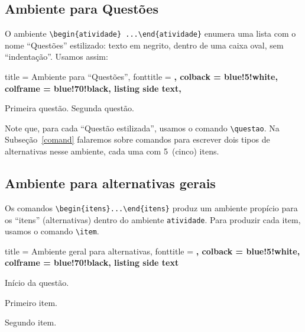 \subsection{Ambiente para Questões}

O ambiente \verb|\begin{atividade} ...\end{atividade}| enumera uma lista com o
nome ``Questões'' estilizado: texto em negrito, dentro de uma caixa oval, sem
``indentação''.
Usamos assim:

\begin{tcblisting}
{
  title     = Ambiente para ``Questões'',
  fonttitle = \bfseries,
  colback   = blue!5!white,
  colframe  = blue!70!black,
  listing side text,
}
\begin{atividade}
 \questao Primeira questão.
 \questao Segunda questão.
\end{atividade}
\end{tcblisting}

Note que, para cada ``Questão estilizada'', usamos o comando \verb|\questao|.
Na Subseção~\ref{comand} falaremos sobre comandos para escrever dois tipos de 
alternativas nesse ambiente, cada uma com 5~(cinco) itens.

\subsection{Ambiente para alternativas gerais}

Os comandos \verb|\begin{itens}...\end{itens}| produz um ambiente propício para
os ``itens'' (alternativas) dentro do ambiente \texttt{atividade}.
Para produzir cada item, usamos o comando \verb|\item|.


\begin{tcblisting}
{
  title     = Ambiente geral para alternativas,
  fonttitle = \bfseries,
  colback   = blue!5!white,
  colframe  = blue!70!black,
  listing side text
}
\begin{atividade}
\questao Início da questão.
\begin{itens}
 \item Primeiro item.
 \item Segundo item.
\end{itens}
\end{atividade}
\end{tcblisting}

